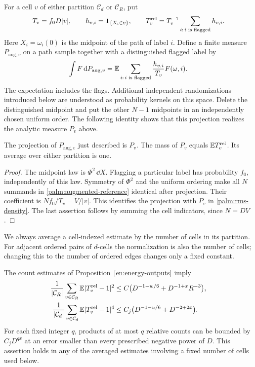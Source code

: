 For a cell $v$ of either partition $\mathcal C_d$ or $\mathcal C_R$, put
\begin{equation}\label{palm:tag-count}
 T_v=f_0D|v|,\qquad h_{v,i}=\mathbf 1_{\{X_i\in v\}},\qquad
 T_v^{\mathrm{rel}}=T_v^{-1}\sum_{i:\,i\text{ is flagged}}h_{v,i}.
\end{equation}
Here $X_i=\omega_i(0)$ is the midpoint of the path of label $i$.
Define a finite measure $P_{\mathrm{aug},v}$ on a path sample together
with a distinguished flagged label by
\begin{equation}\label{palm:augmented-reference}
 \int F\,\mathrm d P_{\mathrm{aug},v}
 =\mathbb E\sum_{i:\,i\text{ is flagged}}\frac{h_{v,i}}{T_v}F(\omega,i).
\end{equation}
The expectation includes the flags.  Additional independent randomizations
introduced below are understood as probability kernels on this space.
Delete the distinguished midpoint and put the other $N-1$ midpoints in
an independently chosen uniform order.  The following identity shows
that this projection realizes the analytic measure $P_v$ above.

\begin{lemma}
\label{palm:reference}
The projection of $P_{\mathrm{aug},v}$ just described is $P_v$.
The mass of $P_v$ equals $\mathbb E T_v^{\mathrm{rel}}$.  Its average over
either partition is one.
\end{lemma}

\begin{proof}
The midpoint law is $\Phi^2\,\dd X$.  Flagging a particular label has
probability $f_0$, independently of this law.  Symmetry of $\Phi^2$ and
the uniform ordering make all $N$ summands in
\eqref{palm:augmented-reference} identical after projection.  Their
coefficient is $Nf_0/T_v=V/|v|$.  This identifies the projection with
$P_v$ in \eqref{palm:rms-density}.  The last assertion follows by summing the
cell indicators, since $N=DV$.
\end{proof}

We always average a cell-indexed estimate by the number of cells in its
partition.  For adjacent ordered pairs of $d$-cells the normalization is
also the number of cells; changing this to the number of ordered edges
changes only a fixed constant.

\begin{lemma}
\label{palm:counts}
The count estimates of Proposition~\ref{en:energy-outputs} imply
\begin{align}
 \frac1{|\mathcal C_R|}\sum_{v\in\mathcal C_R}
       \mathbb E|T_v^{\mathrm{rel}}-1|^2
 &\le C\bigl(D^{-1-w/6}+D^{-1+x}R^{-3}\bigr),
       \label{palm:R-count-moment}\\
 \frac1{|\mathcal C_d|}\sum_{v\in\mathcal C_d}
       \mathbb E|T_v^{\mathrm{rel}}-1|^4
 &\le C_j\bigl(D^{-1-u/6}+D^{-2+2x}\bigr).
       \label{palm:d-count-moment}
\end{align}
For each fixed integer $q$, products of at most $q$ relative counts
can be bounded by $C_jD^{qx}$ at an error smaller than every prescribed
negative power of $D$.  This assertion holds in any of the averaged
estimates involving a fixed number of cells used below.
\end{lemma}

